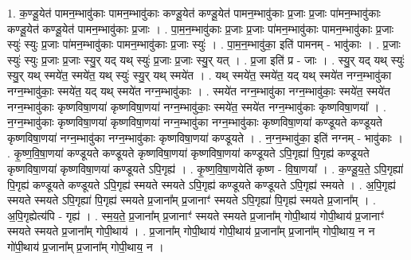 \documentclass[17pt]{extarticle}
\begin{document}
1. क॒ण्डू॒येत॑ पामन॒म्भावु॑काः पामन॒म्भावु॑काः कण्डू॒येत॑ कण्डू॒येत॑ पामन॒म्भावु॑काः प्र॒जाः प्र॒जाः पा॑मन॒म्भावु॑काः कण्डू॒येत॑ कण्डू॒येत॑ पामन॒म्भावु॑काः प्र॒जाः । . पा॒म॒न॒म्भावु॑काः प्र॒जाः प्र॒जाः पा॑मन॒म्भावु॑काः पामन॒म्भावु॑काः प्र॒जाः स्युः॑ स्युः प्र॒जाः पा॑मन॒म्भावु॑काः पामन॒म्भावु॑काः प्र॒जाः स्युः॑ । . पा॒म॒न॒म्भावु॑का॒ इति॑ पामनम् - भावु॑काः । . प्र॒जाः स्युः॑ स्युः प्र॒जाः प्र॒जाः स्यु॒र् यद् यथ् स्युः॑ प्र॒जाः प्र॒जाः स्यु॒र् यत् । . प्र॒जा इति॑ प्र - जाः । . स्यु॒र् यद् यथ् स्युः॑ स्यु॒र् यथ् स्मये॑त॒ स्मये॑त॒ यथ् स्युः॑ स्यु॒र् यथ् स्मये॑त । . यथ् स्मये॑त॒ स्मये॑त॒ यद् यथ् स्मये॑त नग्न॒म्भावु॑का नग्न॒म्भावु॑काः॒ स्मये॑त॒ यद् यथ् स्मये॑त नग्न॒म्भावु॑काः । . स्मये॑त नग्न॒म्भावु॑का नग्न॒म्भावु॑काः॒ स्मये॑त॒ स्मये॑त नग्न॒म्भावु॑काः कृष्णविषा॒णया॑ कृष्णविषा॒णया॑ नग्न॒म्भावु॑काः॒ स्मये॑त॒ स्मये॑त नग्न॒म्भावु॑काः कृष्णविषा॒णया᳚ । . न॒ग्न॒म्भावु॑काः कृष्णविषा॒णया॑ कृष्णविषा॒णया॑ नग्न॒म्भावु॑का नग्न॒म्भावु॑काः कृष्णविषा॒णया॑ कण्डूयते कण्डूयते कृष्णविषा॒णया॑ नग्न॒म्भावु॑का नग्न॒म्भावु॑काः कृष्णविषा॒णया॑ कण्डूयते । . न॒ग्न॒म्भावु॑का॒ इति॑ नग्नम् - भावु॑काः । . कृ॒ष्ण॒वि॒षा॒णया॑ कण्डूयते कण्डूयते कृष्णविषा॒णया॑ कृष्णविषा॒णया॑ कण्डूयते ऽपि॒गृह्या॑ पि॒गृह्य॑ कण्डूयते कृष्णविषा॒णया॑ कृष्णविषा॒णया॑ कण्डूयते ऽपि॒गृह्य॑ । . कृ॒ष्ण॒वि॒षा॒णयेति॑ कृष्ण - वि॒षा॒णया᳚ । . क॒ण्डू॒य॒ते॒ ऽपि॒गृह्या॑ पि॒गृह्य॑ कण्डूयते कण्डूयते ऽपि॒गृह्य॑ स्मयते स्मयते ऽपि॒गृह्य॑ कण्डूयते कण्डूयते ऽपि॒गृह्य॑ स्मयते । . अ॒पि॒गृह्य॑ स्मयते स्मयते ऽपि॒गृह्या॑ पि॒गृह्य॑ स्मयते प्र॒जाना᳚म् प्र॒जानाꣳ॑ स्मयते ऽपि॒गृह्या॑ पि॒गृह्य॑ स्मयते प्र॒जाना᳚म् । . अ॒पि॒गृह्येत्य॑पि - गृह्य॑ । . स्म॒य॒ते॒ प्र॒जाना᳚म् प्र॒जानाꣳ॑ स्मयते स्मयते प्र॒जाना᳚म् गोपी॒थाय॑ गोपी॒थाय॑ प्र॒जानाꣳ॑ स्मयते स्मयते प्र॒जाना᳚म् गोपी॒थाय॑ । . प्र॒जाना᳚म् गोपी॒थाय॑ गोपी॒थाय॑ प्र॒जाना᳚म् प्र॒जाना᳚म् गोपी॒थाय॒ न न गो॑पी॒थाय॑ प्र॒जाना᳚म् प्र॒जाना᳚म् गोपी॒थाय॒ न । \newline
\end{document}
